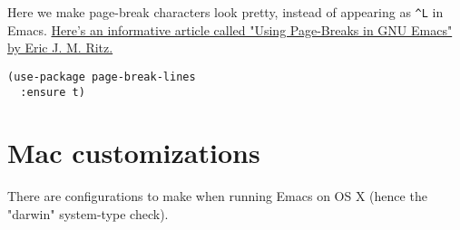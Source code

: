 \documentclass[11pt]{article}
\begin{document}
Here we make page-break characters look pretty, instead of appearing
as \texttt{\textasciicircum{}L} in Emacs. \href{http://ericjmritz.name/2015/08/29/using-page-breaks-in-gnu-emacs/}{Here's an informative article called "Using
Page-Breaks in GNU Emacs" by Eric J. M. Ritz.}

\begin{verbatim}
(use-package page-break-lines
  :ensure t)
\end{verbatim}

\section{Mac customizations}
\label{sec-7}

There are configurations to make when running Emacs on OS X (hence the
"darwin" system-type check).
\end{document}
